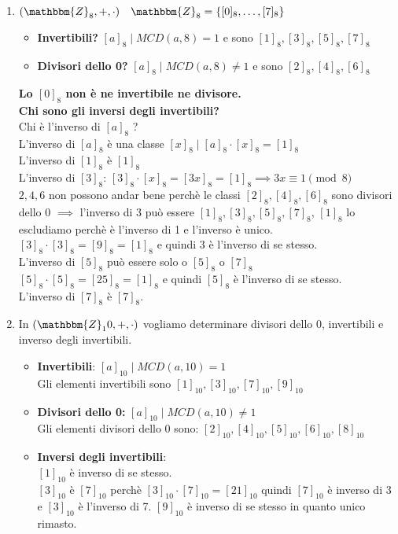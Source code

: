 \documentclass[12pt, letterpaper]{report}
\begin{document}
 		\begin{enumerate}
 			\item $(\mathbbm{Z}_8, +, \cdot) \quad \mathbbm{Z}_8 = \{[0]_8, \dots, [7]_8\}$
 			\begin{itemize}
 				\item \textbf{Invertibili?} $[a]_8 \mid MCD(a, 8) = 1$  e sono $[1]_8, [3]_8, [5]_8, [7]_8$
 				\item \textbf{Divisori dello 0?} $[a]_8 \mid MCD(a, 8) \neq 1$ e sono $[2]_8, [4]_8, [6]_8$
 			\end{itemize}
 			\textbf{Lo $[0]_8$ non è ne invertibile ne divisore.} \\
 			\textbf{Chi sono gli inversi degli invertibili?} \\
 			Chi è l'inverso di $[a]_8$ ? \\
 			L'inverso di $[a]_8$ è una classe $[x]_8 \mid [a]_8 \cdot [x]_8 = [1]_8$ \\
 			L'inverso di $[1]_8$ è $[1]_8$ \\
 			L'inverso di $[3]_8$: $[3]_8 \cdot [x]_8 = [3x]_8 = [1]_8 \implies 3x \equiv 1 \pmod{8}$ \\
 			$2,4,6$ non possono andar bene perchè le classi $[2]_8, [4]_8, [6]_8$ sono divisori dello 0 $\implies$ l'inverso di 3 può essere $[1]_8, [3]_8, [5]_8, [7]_8$, $[1]_8$ lo escludiamo perchè è l'inverso di 1 e l'inverso è unico. \\
 			$[3]_8 \cdot [3]_8 = [9]_8 = [1]_8$ e quindi 3 è l'inverso di se stesso. \\
 			L'inverso di $[5]_8$ può essere solo o $[5]_8$ o $[7]_8$ \\
 			$[5]_8 \cdot [5]_8 = [25]_8 = [1]_8$ e quindi $[5]_8$ è l'inverso di se stesso. \\
 			L'inverso di $[7]_8$ è $[7]_8$. \\
 			\item In $(\mathbbm{Z}_10, +, \cdot)$ vogliamo determinare divisori dello 0, invertibili e inverso degli invertibili.
 			\begin{itemize}
 				\item \textbf{Invertibili}: $[a]_{10} \mid MCD(a, 10) = 1$ \\
 				Gli elementi invertibili sono $[1]_{10}, [3]_{10}, [7]_{10}, [9]_{10}$
 				\item \textbf{Divisori dello 0:} $[a]_{10} \mid MCD(a, 10) \neq 1$ \\
 				Gli elementi divisori dello 0 sono: $[2]_{10}, [4]_{10}, [5]_{10}, [6]_{10}, [8]_{10}$
 				\item \textbf{Inversi degli invertibili}: \\
 				$[1]_{10}$ è inverso di se stesso. \\
 				$[3]_{10}$ è $[7]_{10}$ perchè $[3]_{10} \cdot [7]_{10} = [21]_{10}$ quindi $[7]_{10}$ è inverso di 3 e $[3]_{10}$ è l'inverso di 7.
 				$[9]_{10}$ è inverso di se stesso in quanto unico rimasto.
 			\end{itemize}
 		\end{enumerate}
\end{document}
